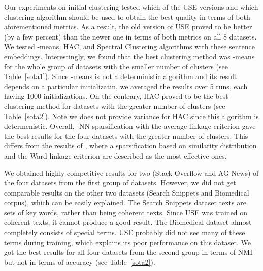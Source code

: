 \documentclass[11pt,a4paper]{article}
\begin{document}
Our experiments on initial clustering tested which of the USE versions and which clustering algorithm should be used to obtain the best quality in terms of both aforementioned metrics. As a result, the old version of USE \cite{DBLP:journals/corr/abs-1803-11175} proved to be better (by a few percent) than the newer one \cite{DBLP:journals/corr/abs-1907-04307} in terms of both metrics on all 8 datasets. We tested -means, HAC, and Spectral Clustering algorithms with these sentence embeddings. Interestingly, we found that the best clustering method was -means for the whole group of datasets with the smaller number of clusters (see Table~\ref{sota1}). Since -means is not a deterministic algorithm and its result depends on a particular initializatin, we averaged the results over 5 runs, each having 1000 initializations. On the contrary, HAC proved to be the best clustering method for datasets with the greater number of clusters (see Table~\ref{sota2}). Note we does not provide variance for HAC since this algorithm is determenistic.  Overall, -NN sparsification  with the average linkage criterion gave the best results for the four datasets with the greater number of clusters. This differs from the results of \cite{rakib2020enhancement}, where a sparsification based on similarity distribution and the Ward linkage criterion are described as the most effective ones.

We obtained highly competitive results for two (Stack Overflow and AG News) of the four datasets from the first group of datasets. However, we did not get comparable results on the other two datasets (Search Snippets and Biomedical corpus), which can be easily explained. The Search Snippets dataset texts are sets of key words, rather than being coherent texts. Since USE was trained on coherent texts, it cannot produce a good result. The Biomedical dataset almost completely consists of special terms. USE probably did not see many of these terms during training, which explains its poor performance on this dataset. We got the best results for all four datasets from the second group in terms of NMI but not in terms of accuracy (see Table~\ref{sota2}).
\end{document}

